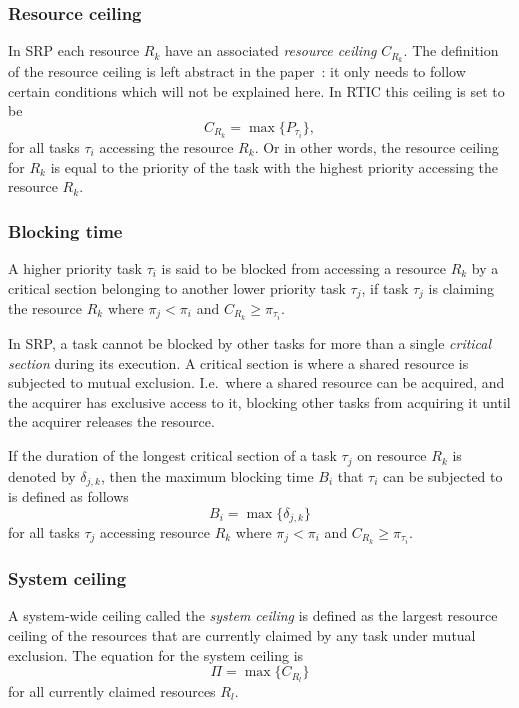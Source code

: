 \subsubsection{Resource ceiling}\label{theory:srp:definitions:resource}
In SRP each resource $R_k$ have an associated \emph{resource ceiling}
$C_{R_k}$. The definition of the resource ceiling is left abstract in the
paper~\cite{srp}: it only needs to follow certain conditions which will not be
explained here. In RTIC this ceiling is set to be
\begin{equation}
    C_{R_k} = \max\{P_{\tau_i}\},
\end{equation}
for all tasks $\tau_i$ accessing the resource $R_k$. Or in other words,
the resource ceiling for $R_k$ is equal to the priority of the task with the
highest priority accessing the resource $R_k$.

\subsubsection{Blocking time}\label{theory:srp:definitions:blocking}
A higher priority task $\tau_i$ is said to be blocked from accessing a resource
$R_k$ by a critical section belonging to another lower priority task $\tau_j$,
if task $\tau_j$ is claiming the resource $R_k$ where $\pi_j < \pi_i$ and
$C_{R_k} \geq \pi_{\tau_i}$.

In SRP, a task cannot be blocked by other tasks for more than a single
\emph{critical section} during its execution. A critical section is where a
shared resource is subjected to mutual exclusion. I.e.\ where a shared resource
can be acquired, and the acquirer has exclusive access to it, blocking other
tasks from acquiring it until the acquirer releases the resource.

If the duration of the longest critical section of a task $\tau_j$ on resource
$R_k$ is denoted by $\delta_{j,k}$, then the maximum blocking time $B_i$
that $\tau_i$ can be subjected to is defined as follows
\begin{equation}
    B_i = \max\{\delta_{j,k}\}
\end{equation}
for all tasks $\tau_j$ accessing resource $R_k$ where $\pi_j < \pi_i$ and
$C_{R_k} \geq \pi_{\tau_i}$.

\subsubsection{System ceiling}\label{theory:srp:definitions:system}
A system-wide ceiling called the \emph{system ceiling} is defined as the
largest resource ceiling of the resources that are currently claimed by
any task under mutual exclusion. The equation for the system ceiling is
\begin{equation}
    \Pi = \max\{C_{R_l}\}
\end{equation}
for all currently claimed resources $R_l$.

